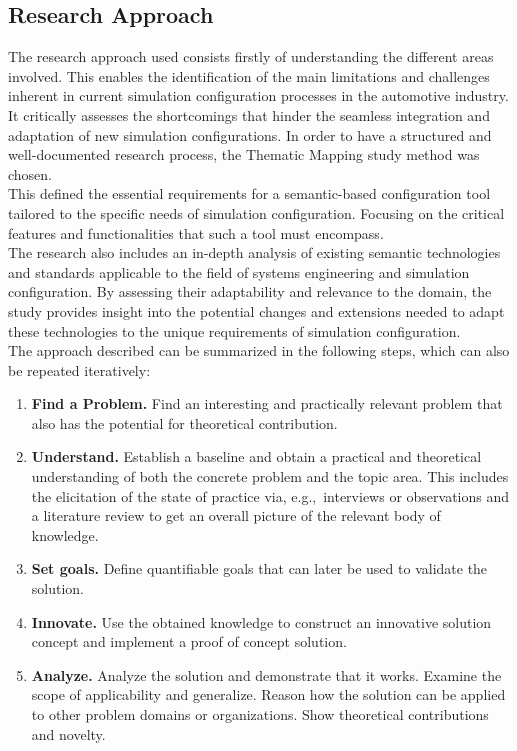 \clearpage
\subsection{Research Approach}
The research approach used consists firstly of understanding the different areas involved. This enables the identification of the main limitations and challenges inherent in current simulation configuration processes in the automotive industry. It critically assesses the shortcomings that hinder the seamless integration and adaptation of new simulation configurations.
In order to have a structured and well-documented research process, the Thematic Mapping study method was chosen.\\

This defined the essential requirements for a semantic-based configuration tool tailored to the specific needs of simulation configuration. Focusing on the critical features and functionalities that such a tool must encompass.\\

The research also includes an in-depth analysis of existing semantic technologies and standards applicable to the field of systems engineering and simulation configuration. By assessing their adaptability and relevance to the domain, the study provides insight into the potential changes and extensions needed to adapt these technologies to the unique requirements of simulation configuration.\\

The approach described can be summarized in the following steps, which can also be repeated iteratively:

\begin{enumerate}
    \item \textbf{Find a Problem.} Find an interesting and practically relevant problem that also
        has the potential for theoretical contribution.
    \item \textbf{Understand.} Establish a baseline and obtain a practical and theoretical
        understanding of both the concrete problem and the topic area. This includes the
        elicitation of the state of practice via, e.g.,~interviews or observations and a
        literature review to get an overall picture of the relevant body of knowledge.
    \item \textbf{Set goals.} Define quantifiable goals that can later be used to validate the
        solution.
    \item \textbf{Innovate.} Use the obtained knowledge to construct an innovative solution
        concept and implement a proof of concept solution.
    \item \textbf{Analyze.} Analyze the solution and demonstrate that it works. Examine the scope
        of applicability and generalize. Reason how the solution can be applied to other problem
        domains or organizations. Show theoretical contributions and novelty.
\end{enumerate}


